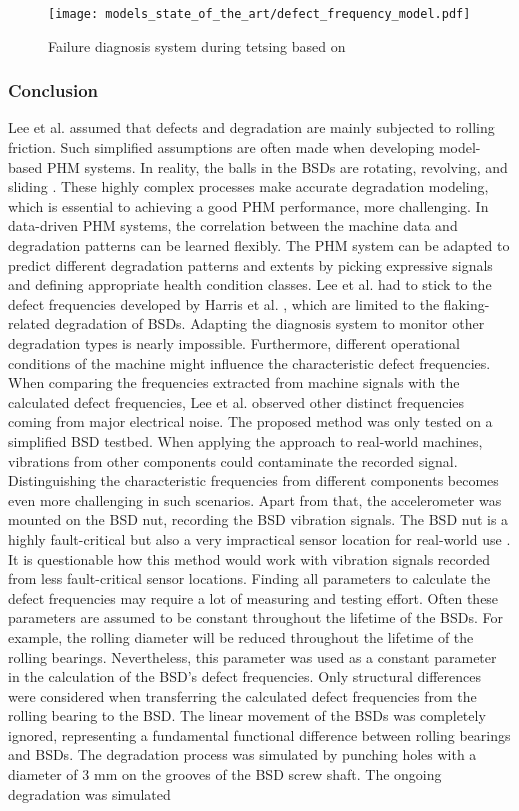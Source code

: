 \begin{figure}[H]
  \centering
  \texttt{[image: models\_state\_of\_the\_art/defect\_frequency\_model.pdf]}
  \caption{Failure diagnosis system during tetsing based on \cite{Lee2015}}
  \label{fig:defect_frequency_model}
\end{figure}

\subsubsection{Conclusion}
Lee et al. \cite{Lee2015} assumed that defects and degradation are mainly subjected to rolling friction. Such simplified assumptions are often made when developing model-based PHM systems. In reality, the balls in the BSDs are rotating, revolving, and sliding \cite{Lee2015}. These highly complex processes make accurate degradation modeling, which is essential to achieving a good PHM performance, more challenging. In data-driven PHM systems, the correlation between the machine data and degradation patterns can be learned flexibly. The PHM system can be adapted to predict different degradation patterns and extents by picking expressive signals and defining appropriate health condition classes. Lee et al. \cite{Lee2015} had to stick to the defect frequencies developed by Harris et al. \cite{Harris1996}, which are limited to the flaking-related degradation of BSDs. Adapting the diagnosis system to monitor other degradation types is nearly impossible. Furthermore, different operational conditions of the machine might influence the characteristic defect frequencies. When comparing the frequencies extracted from machine signals with the calculated defect frequencies, Lee et al. observed other distinct frequencies coming from major electrical noise. The proposed method was only tested on a simplified BSD testbed. When applying the approach to real-world machines, vibrations from other components could contaminate the recorded signal. Distinguishing the characteristic frequencies from different components becomes even more challenging in such scenarios. Apart from that, the accelerometer was mounted on the BSD nut, recording the BSD vibration signals. The BSD nut is a highly fault-critical but also a very impractical sensor location for real-world use \cite{Pandhare2021}. It is questionable how this method would work with vibration signals recorded from less fault-critical sensor locations. Finding all parameters to calculate the defect frequencies may require a lot of measuring and testing effort. Often these parameters are assumed to be constant throughout the lifetime of the BSDs. For example, the rolling diameter will be reduced throughout the lifetime of the rolling bearings. Nevertheless, this parameter was used as a constant parameter in the calculation of the BSD's defect frequencies. Only structural differences were considered when transferring the calculated defect frequencies from the rolling bearing to the BSD. The linear movement of the BSDs was completely ignored, representing a fundamental functional difference between rolling bearings and BSDs. The degradation process was simulated by punching holes with a diameter of 3 mm on the grooves of the BSD screw shaft. The ongoing degradation was simulated 